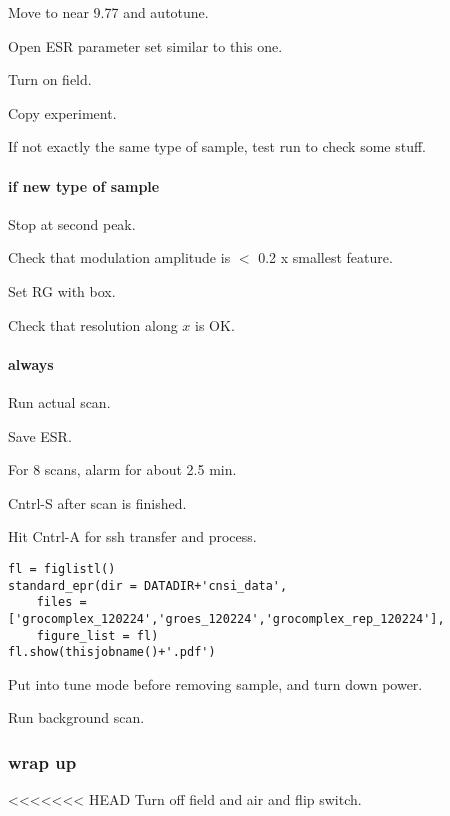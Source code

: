 \begin{scriptsize}
\begin{python}[off]
Move to near 9.77 and autotune.

Open ESR parameter set similar to this one.

Turn on field.

Copy experiment.

If not exactly the same type of sample, test run to check some stuff.


\paragraph{if new type of sample}
Stop at second peak.

Check that modulation amplitude is $<$ 0.2 x smallest feature.

Set RG with box.

Check that resolution along $x$ is OK.

\paragraph{always}

Run actual scan.

Save ESR.

For 8 scans, alarm for about 2.5 min.

Cntrl-S after scan is finished.

Hit Cntrl-A for ssh transfer and process.


\begin{tiny}
\begin{lstlisting}
fl = figlistl()
standard_epr(dir = DATADIR+'cnsi_data',
    files = ['grocomplex_120224','groes_120224','grocomplex_rep_120224'],
    figure_list = fl)
fl.show(thisjobname()+'.pdf')
\end{lstlisting}
\end{tiny}

Put into tune mode before removing sample, and turn down power.

Run background scan.

\subsubsection{wrap up}
<<<<<<< HEAD
Turn off field and air and flip switch.


\end{python}
\end{scriptsize}
